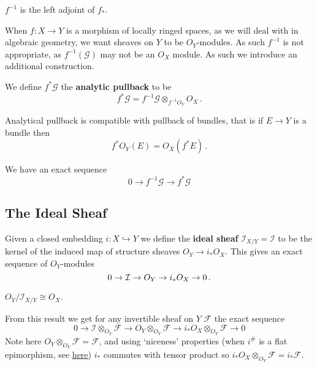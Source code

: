 \documentclass{article}
\begin{document}
\begin{prop}
	$f^{-1}$ is the left adjoint of $f_\ast$. 
\end{prop}

When $f:X \to Y$ is a morphism of locally ringed spaces, as we will deal with in algebraic geometry, we want sheaves on $Y$ to be $O_Y$-modules. As such $f^{-1}$ is not appropriate, as $f^{-1}(\mathcal{G})$ may not be an $O_X$ module. As such we introduce an additional construction.

\begin{definition}
	We define $f^\ast \mathcal{G}$ the \textbf{analytic pullback} to be  
	\[
	f^\ast \mathcal{G} = f^{-1} \mathcal{G} \otimes_{f^{-1} O_Y} O_X \, .
	\]
\end{definition}

\begin{lemma}
	Analytical pullback is compatible with pullback of bundles, that is if $E\to Y$ is a bundle then 
	\[
	f^\ast O_Y(E) = O_X(f^\ast E) \, .
	\]
\end{lemma}


\begin{prop}
We have an exact sequence
\[
0 \to f^{-1} \mathcal{G} \to f^\ast \mathcal{G}
\]
\end{prop}



\subsection{The Ideal Sheaf}

\begin{definition}
	Given a closed embedding $i :X\hookrightarrow Y$ we define the \textbf{ideal sheaf} $\mathcal{I}_{X/Y} = \mathcal{I}$ to be the kernel of the induced map of structure sheaves $O_Y \to i_\ast O_X$. This gives an exact sequence of $O_Y$-modules 
	\[
	0 \to \mathcal{I} \to O_Y \to i_\ast O_X \to 0\, .
	\]
\end{definition}


\begin{lemma}
	$O_Y/\mathcal{I}_{X/Y} \cong O_X$. 
\end{lemma}
From this result we get for any invertible sheaf on $Y$ $\mathcal{F}$ the exact sequence 
\[
0 \to \mathcal{I} \otimes_{O_Y} \mathcal{F} \to O_Y \otimes_{O_Y} \mathcal{F} \to i_\ast O_X \otimes_{O_Y} \mathcal{F} \to 0  
\]
Note here $O_Y \otimes_{O_Y} \mathcal{F} = \mathcal{F}$, and using `niceness' properties (when $i^\#$ is a flat epimorphism, see \href{https://mathoverflow.net/questions/49134/when-does-the-direct-image-functor-commute-with-tensor-products}{here}) $i_\ast$ commutes with tensor product so $i_\ast O_X \otimes_{O_Y} \mathcal{F} = i_\ast \mathcal{F}$. 
\end{document}
